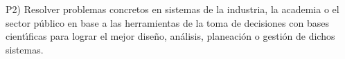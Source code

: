 P2) Resolver problemas concretos en sistemas de la industria, la
academia o el sector p\'{u}blico en base a las herramientas de la toma de
decisiones con bases cient\'{\i}ficas para lograr el mejor dise\~{n}o,
an\'{a}lisis, planeaci\'{o}n o gesti\'{o}n de dichos sistemas.

